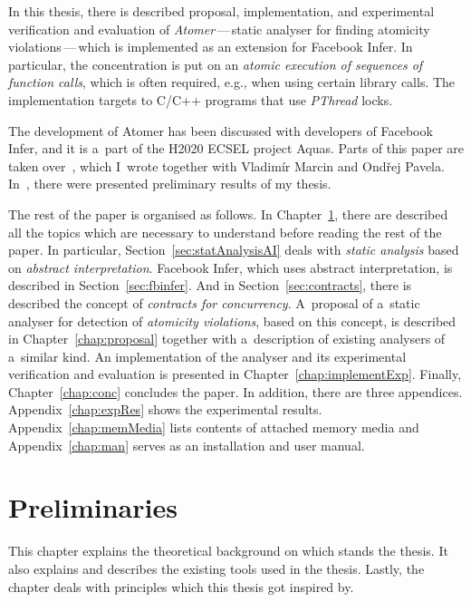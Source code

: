 In this thesis, there is described proposal, implementation, and experimental
verification and evaluation of \emph{Atomer}\,---\,static analyser for
finding atomicity violations\,---\,which is implemented as an extension for
Facebook Infer. In particular, the concentration is put on an
\emph{atomic execution of sequences of function calls}, which is often
required, e.g., when using certain library calls. The implementation targets
to C/C++ programs that use \emph{PThread} locks.

The development of Atomer has been discussed with developers of
Facebook Infer, and it is a~part of the H2020 ECSEL project Aquas. Parts
of this paper are taken over~\cite{excel2019FBInfer}, which I~wrote
together with Vladimír Marcin and Ondřej Pavela. In~\cite{excel2019FBInfer},
there were presented preliminary results of my thesis.

The rest of the paper is organised as follows. In
Chapter~\ref{chap:prelim}, there are described all the topics
which are necessary to understand before reading the rest of the paper. In
particular, Section~\ref{sec:statAnalysisAI} deals with
\emph{static analysis} based on \emph{abstract interpretation}.
Facebook Infer, which uses abstract interpretation, is described in
Section~\ref{sec:fbinfer}. And in Section~\ref{sec:contracts}, there is
described the concept of \emph{contracts for concurrency}. A~proposal of
a~static analyser for detection of \emph{atomicity violations}, based on this
concept, is described in Chapter~\ref{chap:proposal} together with
a~description of existing analysers of a~similar kind. An implementation
of the analyser and its experimental verification and evaluation is
presented in Chapter~\ref{chap:implementExp}. Finally, Chapter~\ref{chap:conc}
concludes the paper. In addition, there are three appendices.
Appendix~\ref{chap:expRes} shows the experimental results.
Appendix~\ref{chap:memMedia} lists contents of attached memory media and
Appendix~\ref{chap:man} serves as an installation and user manual.



\chapter{Preliminaries}
\label{chap:prelim}

This chapter explains the theoretical background on which stands the
thesis. It also explains and describes the existing tools used in the
thesis. Lastly, the chapter deals with principles which this thesis
got inspired by.

